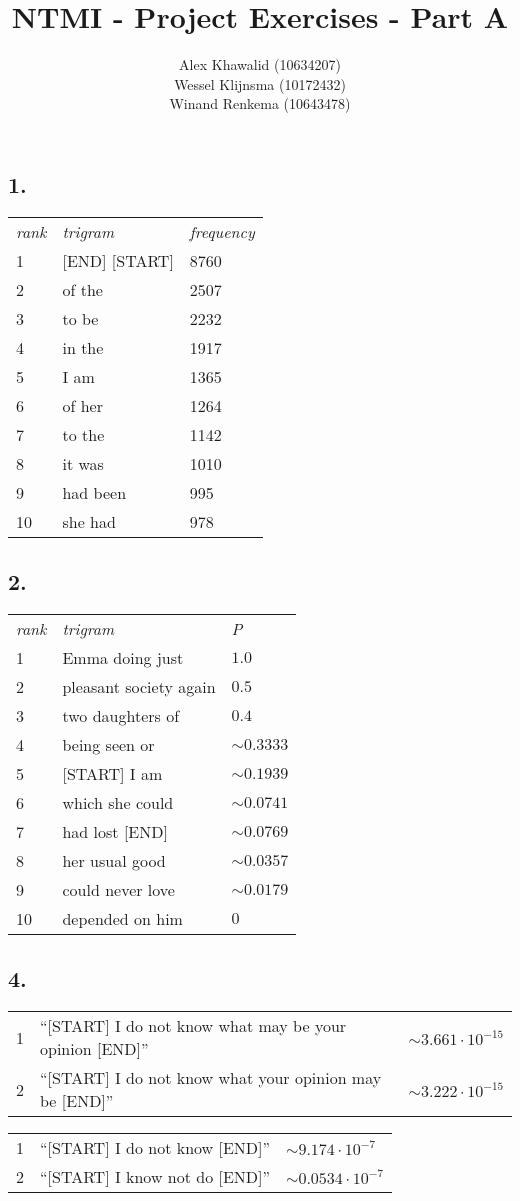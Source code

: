 \documentclass[a4paper, 10pt]{article}
\title{NTMI - Project Exercises - Part A}
\author{Alex Khawalid (10634207)\\
Wessel Klijnsma (10172432)\\
Winand Renkema (10643478)\\
}
\begin{document}
\maketitle

\subsection*{1.}
\begin{tabular}{l l l}
\textit{rank}&	\textit{trigram}	& \textit{frequency} \\
1	&	[END] [START]	& 8760\\
2	&	of the			& 2507\\
3	&	to be			& 2232\\
4	&	in the			& 1917\\
5	&	I am			& 1365\\
6	&	of her			& 1264\\
7	&	to the			& 1142\\
8	&	it was			& 1010\\
9	&	had been		& 995\\
10	&	she had			& 978\\
\end{tabular}

\subsection*{2.}
\begin{tabular}{l l l}
\textit{rank}&	\textit{trigram}	& \textit{P} \\
1	&	Emma doing just			&	 $1.0$\\
2	&	pleasant society again	&	 $0.5$\\
3	&	two daughters of		&	 $0.4$\\
4	&	being seen or			&	 $\sim 0.3333$\\
5	&	[START] I am			&	 $\sim 0.1939$\\
6	&	which she could			&	 $\sim 0.0741$\\
7	&	had lost [END]			&	 $\sim 0.0769$\\
8	&	her usual good			&	 $\sim 0.0357$\\
9	&	could never love		&	 $\sim 0.0179$\\
10	&	depended on him			&	 $0$\\
\end{tabular}

\subsection*{4.}
\begin{tabular}{l l l}
1	&	``[START] I do not know what may be your opinion [END]'' & $\sim 3.661 \cdot 10^{-15}$\\
2	&	``[START] I do not know what your opinion may be [END]'' & $\sim 3.222 \cdot 10^{-15}$\\
\end{tabular}


\begin{tabular}{l l l}
1	& ``[START] I do not know [END]''	& $\sim 9.174 \cdot 10^{-7}$ \\
2	& ``[START] I know not do [END]''	& $\sim 0.0534 \cdot 10^{-7}$\\
\end{tabular}
\end{document}
